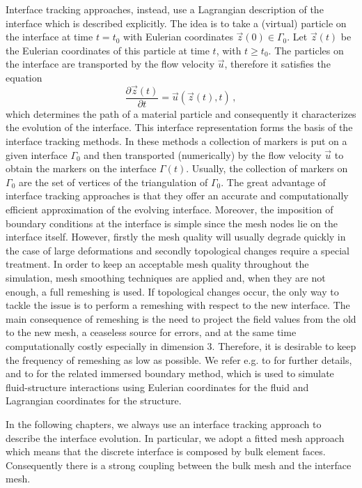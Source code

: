 Interface tracking approaches, instead, use a Lagrangian description of the
interface which is described explicitly. The idea is to take a (virtual)
particle on the interface at time $t=t_0$ with Eulerian coordinates $\vec z(0)
\in \Gamma_0$. Let $\vec z(t)$ be the Eulerian coordinates of this particle at
time $t$, with $t\geq t_0$. The particles on the interface are transported by
the flow velocity $\vec u$, therefore it satisfies the equation
\begin{equation}
\frac{\partial \vec z(t)}{\partial t}=\vec u(\vec z(t),t)\,,
\end{equation}
which determines the path of a material particle and consequently it
characterizes the evolution of the interface. This interface representation
forms the basis of the interface tracking methods. In these methods a
collection of markers is put on a given interface $\Gamma_0$ and then
transported (numerically) by the flow velocity $\vec u$ to obtain the markers
on the interface $\Gamma(t)$. Usually, the collection of markers on $\Gamma_0$
are the set of vertices of the triangulation of $\Gamma_0$. The great
advantage of interface tracking approaches is that they offer an accurate and
computationally efficient approximation of the evolving interface. Moreover,
the imposition of boundary conditions at the interface is simple since the mesh
nodes lie on the interface itself. However, firstly the mesh quality will
usually degrade quickly in the case of large deformations and secondly
topological changes require a special treatment. In order to keep an
acceptable mesh quality throughout the simulation, mesh smoothing techniques
are applied and, when they are not enough, a full remeshing is used. If
topological changes occur, the only way to tackle the issue is to
perform a remeshing with respect to the new interface. The main consequence of
remeshing is the need to project the field values from the old to the new
mesh, a ceaseless source for errors, and at the same time computationally
costly especially in dimension 3. Therefore, it is desirable to keep the
frequency of remeshing as low as possible. We refer e.g. to
\cite{UnverdiT92,Bansch01,Tryggvason_etal01,GanesanMT07,GanesanT08,spurious,
fluidfbp} for further details, and to \cite{LevequeL97,Peskin02} for the
related immersed boundary method, which is used to simulate fluid-structure
interactions using Eulerian coordinates for the fluid and Lagrangian
coordinates for the structure.

In the following chapters, we always use an interface tracking approach to
describe the interface evolution. In particular, we adopt a fitted mesh approach
which means that the discrete interface is composed by bulk element faces.
Consequently there is a strong coupling between the bulk mesh and the interface
mesh.

